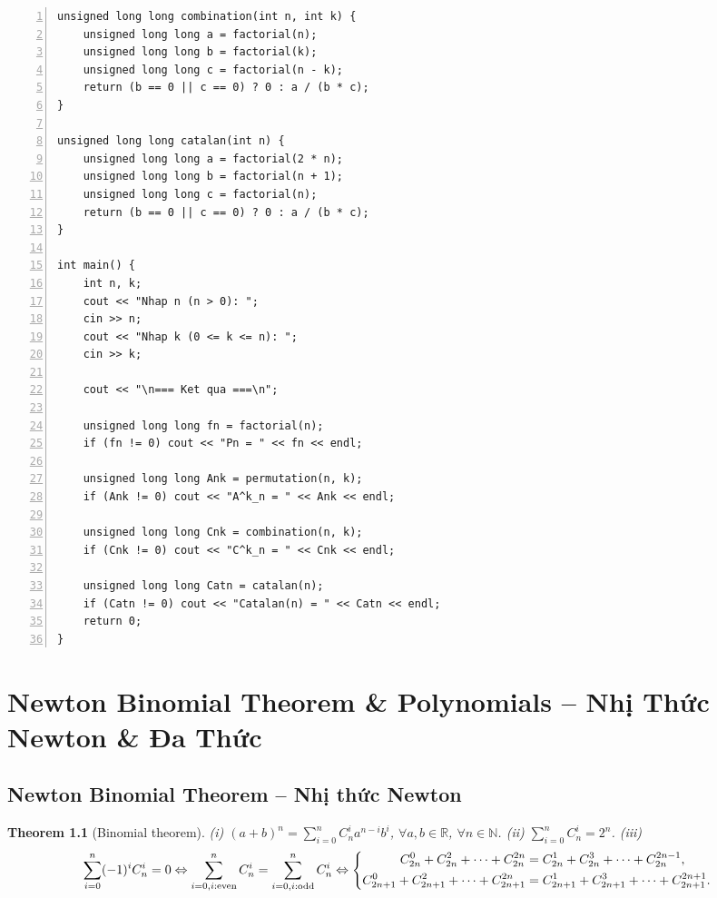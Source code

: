 \documentclass[oneside]{book}
\newtheorem{theorem}{Theorem}
\begin{document}
\begin{enumerate}
\begin{Verbatim}[numbers=left,xleftmargin=5mm]
unsigned long long combination(int n, int k) {
    unsigned long long a = factorial(n);
    unsigned long long b = factorial(k);
    unsigned long long c = factorial(n - k);
    return (b == 0 || c == 0) ? 0 : a / (b * c);
}

unsigned long long catalan(int n) {
    unsigned long long a = factorial(2 * n);
    unsigned long long b = factorial(n + 1);
    unsigned long long c = factorial(n);
    return (b == 0 || c == 0) ? 0 : a / (b * c);
}

int main() {
    int n, k;
    cout << "Nhap n (n > 0): ";
    cin >> n;
    cout << "Nhap k (0 <= k <= n): ";
    cin >> k;
	
    cout << "\n=== Ket qua ===\n";
	
    unsigned long long fn = factorial(n);
    if (fn != 0) cout << "Pn = " << fn << endl;
	
    unsigned long long Ank = permutation(n, k);
    if (Ank != 0) cout << "A^k_n = " << Ank << endl;
	
    unsigned long long Cnk = combination(n, k);
    if (Cnk != 0) cout << "C^k_n = " << Cnk << endl;
	
    unsigned long long Catn = catalan(n);
    if (Catn != 0) cout << "Catalan(n) = " << Catn << endl;
    return 0;
}
	\end{Verbatim}
\end{enumerate}


\chapter{Newton Binomial Theorem \& Polynomials -- Nhị Thức Newton \& Đa Thức}
\minitoc


\section{Newton Binomial Theorem -- Nhị thức Newton}

\begin{theorem}[Binomial theorem]
	(i) $(a + b)^n = \sum_{i=0}^n C_n^ia^{n-i}b^i$, $\forall a,b\in\mathbb{R}$, $\forall n\in\mathbb{N}$. (ii) $\sum_{i=0}^n C_n^i = 2^n$. (iii)
	\begin{equation*}
		\sum_{i=0}^n (-1)^iC_n^i = 0\Leftrightarrow\sum_{i=0,i:{\rm even}}^n C_n^i = \sum_{i=0,i:{\rm odd}}^n C_n^i\Leftrightarrow\left\{\begin{split}
			C_{2n}^0 + C_{2n}^2 + \cdots + C_{2n}^{2n} &= C_{2n}^1 + C_{2n}^3 + \cdots + C_{2n}^{2n-1},\\
			C_{2n+1}^0 + C_{2n+1}^2 + \cdots + C_{2n+1}^{2n} &= C_{2n+1}^1 + C_{2n+1}^3 + \cdots + C_{2n+1}^{2n+1}.
		\end{split}\right.
	\end{equation*}	
\end{theorem}
\end{document}
